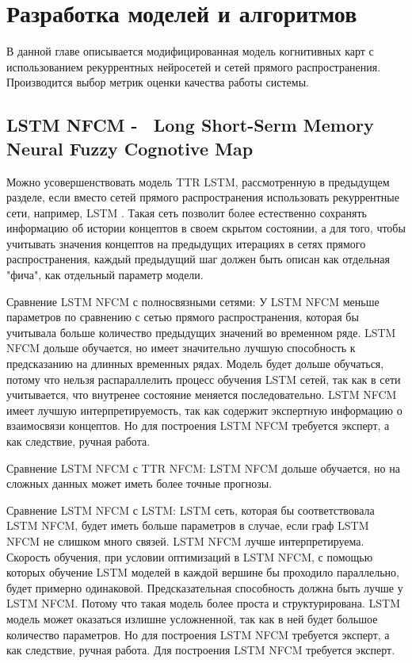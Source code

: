 \chapter{Разработка моделей и алгоритмов}

\begin{annotation}
	В данной главе описывается модифицированная модель
	когнитивных карт с использованием
	рекуррентных нейросетей и сетей прямого распространения.
	Производится выбор метрик оценки качества работы системы.
\end{annotation}

\section{LSTM NFCM -~ Long Short-Serm Memory Neural Fuzzy Cognotive Map}

Можно усовершенствовать модель TTR LSTM, рассмотренную в предыдущем разделе,
если вместо сетей прямого распространения использовать рекуррентные сети,
например, LSTM \cite{LSTM_paper}. Такая сеть позволит более естественно
сохранять информацию об истории концептов в своем скрытом состоянии,
а для того, чтобы учитывать значения концептов на предыдущих итерациях
в сетях прямого распространения, каждый предыдущий шаг должен быть
описан как отдельная "фича", как отдельный параметр модели.

Сравнение LSTM NFCM с полносвязными сетями:
У LSTM NFCM меньше параметров по сравнению с сетью прямого распространения,
которая бы учитывала больше количество предыдущих значений во временном ряде.
LSTM NFCM дольше обучается, но имеет значительно лучшую способность к предсказанию
на длинных временных рядах.
Модель будет дольше обучаться, потому что нельзя распараллелить
процесс обучения LSTM сетей, так как в сети учитывается, что внутренее состояние меняется последовательно.
LSTM NFCM имеет лучшую интерпретируемость, так как содержит
экспертную информацию о взаимосвязи концептов.
Но для построения LSTM NFCM требуется эксперт, а как следствие,
ручная работа.

Сравнение LSTM NFCM с TTR NFCM:
LSTM NFCM дольше обучается, но на сложных данных
может иметь более точные прогнозы.

Сравнение LSTM NFCM с LSTM:
LSTM сеть, которая бы соответствовала LSTM NFCM, будет иметь
больше параметров в случае, если граф LSTM NFCM не слишком
много связей. LSTM NFCM лучше интерпретируема.
Скорость обучения, при условии оптимизаций в LSTM NFCM, с
помощью которых обучение LSTM моделей в каждой вершине бы проходило
параллельно, будет примерно одинаковой.
Предсказательная способность должна быть лучше у LSTM NFCM.
Потому что такая модель более проста и структурирована.
LSTM модель может оказаться излишне усложненной, так как в ней будет
большое количество параметров.
Но для построения LSTM NFCM требуется эксперт, а как следствие,
ручная работа.
Для построения LSTM NFCM требуется эксперт.

